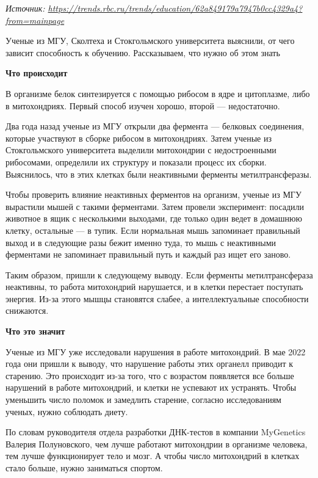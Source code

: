 \textit{Источник: \url{https://trends.rbc.ru/trends/education/62a849179a7947b0cc4329a4?from=mainpage}}

Ученые из МГУ, Сколтеха и Стокгольмского университета выяснили, от чего зависит способность к обучению. Рассказываем, что нужно об этом знать

\textbf{Что происходит}

В организме белок синтезируется с помощью рибосом в ядре и цитоплазме, либо в митохондриях. Первый способ изучен хорошо, второй — недостаточно.

Два года назад ученые из МГУ открыли два фермента — белковых соединения, которые участвуют в сборке рибосом в митохондриях. Затем ученые из Стокгольмского университета выделили митохондрии с недостроенными рибосомами, определили их структуру и показали процесс их сборки. Выяснилось, что в этих клетках были неактивными ферменты метилтрансферазы.

Чтобы проверить влияние неактивных ферментов на организм, ученые из МГУ вырастили мышей с такими ферментами. Затем провели эксперимент: посадили животное в ящик с несколькими выходами, где только один ведет в домашнюю клетку, остальные — в тупик. Если нормальная мышь запоминает правильный выход и в следующие разы бежит именно туда, то мышь с неактивными ферментами не запоминает правильный путь и каждый раз ищет его заново.

Таким образом, пришли к следующему выводу. Если ферменты метилтрансфераза неактивны, то работа митохондрий нарушается, и в клетки перестает поступать энергия. Из-за этого мышцы становятся слабее, а интеллектуальные способности снижаются.

\textbf{Что это значит}

Ученые из МГУ уже исследовали нарушения в работе митохондрий. В мае 2022 года они пришли к выводу, что нарушение работы этих органелл приводит к старению. Это происходит из-за того, что с возрастом появляется все больше нарушений в работе митохондрий, и клетки не успевают их устранять. Чтобы уменьшить число поломок и замедлить старение, согласно исследованиям ученых, нужно соблюдать диету.

По словам руководителя отдела разработки ДНК-тестов в компании MyGenetics Валерия Полуновского, чем лучше работают митохондрии в организме человека, тем лучше функционирует тело и мозг. А чтобы число митохондрий в клетках стало больше, нужно заниматься спортом.

